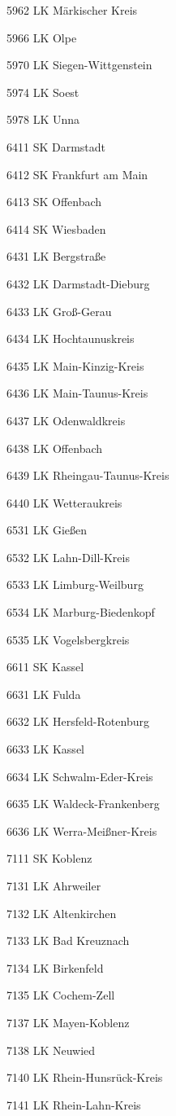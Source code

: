 5962  LK Märkischer Kreis

5966  LK Olpe

5970  LK Siegen-Wittgenstein

5974  LK Soest

5978  LK Unna

6411  SK Darmstadt

6412  SK Frankfurt am Main

6413  SK Offenbach

6414  SK Wiesbaden

6431  LK Bergstraße

6432  LK Darmstadt-Dieburg

6433  LK Groß-Gerau

6434  LK Hochtaunuskreis

6435  LK Main-Kinzig-Kreis

6436  LK Main-Taunus-Kreis

6437  LK Odenwaldkreis

6438  LK Offenbach

6439  LK Rheingau-Taunus-Kreis

6440  LK Wetteraukreis

6531  LK Gießen

6532  LK Lahn-Dill-Kreis

6533  LK Limburg-Weilburg

6534  LK Marburg-Biedenkopf

6535  LK Vogelsbergkreis

6611  SK Kassel

6631  LK Fulda

6632  LK Hersfeld-Rotenburg

6633  LK Kassel

6634  LK Schwalm-Eder-Kreis

6635  LK Waldeck-Frankenberg

6636  LK Werra-Meißner-Kreis

7111  SK Koblenz

7131  LK Ahrweiler

7132  LK Altenkirchen

7133  LK Bad Kreuznach

7134  LK Birkenfeld

7135  LK Cochem-Zell

7137  LK Mayen-Koblenz

7138  LK Neuwied

7140  LK Rhein-Hunsrück-Kreis

7141  LK Rhein-Lahn-Kreis

